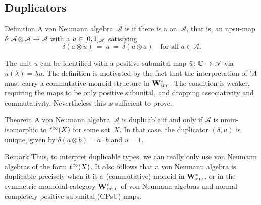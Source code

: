 \documentclass[a]{subfiles}
\begin{document}
\subsection{Duplicators}
\begin{parsec}%
\begin{point}{Definition}%
A von Neumann algebra~$\mathscr{A}$
is 
if there is a  on~$\mathscr{A}$,
that is,
an npsu-map
$\delta\colon \mathscr{A}\otimes \mathscr{A}\to\mathscr{A}$
with a  $u\in [0,1]_{\mathscr{A}}$ 
satisfying
\begin{equation*}
\delta(a\otimes u)\ =\ a\ = \ \delta(u\otimes a)
\quad\text{for all~$a\in\mathscr{A}$.}
\end{equation*}
\end{point}

\noindent
The unit $u$ can be identified with
a positive subunital map $\tilde{u}\colon \mathbb{C}\to \mathscr{A}$ via $\tilde{u}(\lambda)=\lambda u$.
The definition is motivated by the fact that the interpretation of $\mathord{!} A$
must carry a commutative monoid structure in $\mathbf{W}^*_{\text{\textsc{miu}}}$.
The condition is weaker, requiring the maps to be only positive subunital,
and dropping associativity and commutativity.
Nevertheless this is sufficient to prove:
\begin{point}[duplicable]{Theorem}%
A von Neumann algebra~$\mathscr{A}$
is duplicable if and only if
$\mathscr{A}$ is nmiu-isomorphic to $\ell^\infty(X)$ for some set~$X$.
In that case, the duplicator $(\delta,u)$
is unique, given by
$\delta(a\otimes b) = a\cdot b$ and $u=1$.
\end{point}
\begin{point}{Remark}%
Thus, to interpret duplicable types,
we can really only use von Neumann algebras of the form $\ell^\infty(X)$.
It also follows that a von Neumann algebra
is duplicable precisely when it is a (commutative) monoid
in $\mathbf{W}^*_{\text{\textsc{miu}}}$, or in the 
symmetric monoidal category $\mathbf{W}^*_{\text{\textsc{cpsu}}}$ of von Neumann algebras
and normal completely positive subunital (CPsU) maps.


\end{point}
\end{parsec}
\end{document}

